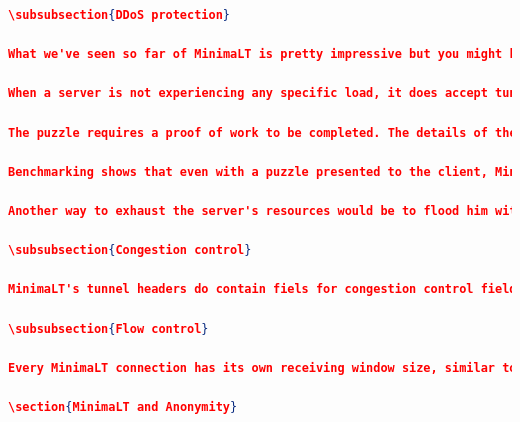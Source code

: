 \documentclass{vldb}
\begin{document}
\begin{lstlisting}[language=json,firstnumber=1]
\subsubsection{DDoS protection}

What we've seen so far of MinimaLT is pretty impressive but you might have legitimate concerns of how this would play out in a threat model were attackers would like to flood a system with the creation of tunnels because DH are expensive computationally-wise. One of the MinimaLT designers, Dan Bernstein, knows this problem really well because he invented the SYN cookies. In MinimaLT, puzzles are used to address the cases where servers are under load.

When a server is not experiencing any specific load, it does accept tunnel establishments requests without any questions asked but if the server is under load, it responds with a puzzle.

The puzzle requires a proof of work to be completed. The details of the proof of work used are not covered in this paper.

Benchmarking shows that even with a puzzle presented to the client, MinimaLT handshakes are faster than TLS/TCP and in most cases (without puzzles), they are faster than unencrypted TCP.\cite{MinimaLT}

Another way to exhaust the server's resources would be to flood him with data to decrypt, but given the fact that past the key exchange only symmetric key encryption is used which on modern system is faster than the network links that would saturate faster.

\subsubsection{Congestion control}

MinimaLT's tunnel headers do contain fiels for congestion control fields such as sequence and acknowledgement numbers. MinimaLT doesn't provide anything additional to what exists in TCP for this task.

\subsubsection{Flow control}

Every MinimaLT connection has its own receiving window size, similar to TCP. 

\section{MinimaLT and Anonymity}


\end{lstlisting}
\end{document}
